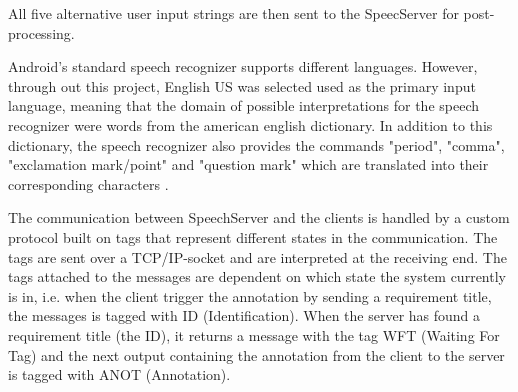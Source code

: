 \documentclass[conference]{IEEEtran}
\begin{document}

All five alternative user input strings are then sent to the SpeecServer for post-processing. %


Android's standard speech recognizer supports different languages. 
However, through out this project, English US was selected used as the primary input language, meaning that the domain of possible interpretations for the speech recognizer were words from the american english dictionary. 
In addition to this dictionary, the speech recognizer also provides the commands "period", "comma", "exclamation mark/point" and "question mark" which are translated into their corresponding characters \cite{typetextbyspeaking}.


The communication between SpeechServer and the clients is handled by a custom protocol built on tags that represent different states in the communication. 
The tags are sent over a TCP/IP-socket and are interpreted at the receiving end.
The tags attached to the messages are dependent on which state the system currently is in, i.e. when the client trigger the annotation by sending a requirement title, the messages is tagged with ID (Identification). When the server has found a requirement title (the ID), it returns a message with the tag WFT (Waiting For Tag) and the next output containing the annotation from the client to the server is tagged with ANOT (Annotation). 
\end{document}
